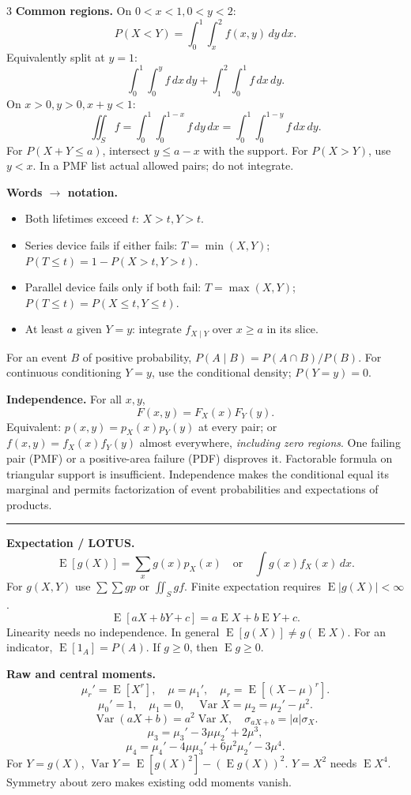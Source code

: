 \documentclass[letterpaper,landscape]{article}
\DeclareMathOperator{\E}{E}
\DeclareMathOperator{\Var}{Var}
\newcommand{\dd}{\,d}
\newcommand{\head}[1]{\vspace{3pt}{\color{navy}\bfseries\fontsize{10}{11}\selectfont #1}\par\vspace{1pt}\hrule\vspace{3pt}}
\newcommand{\mini}[1]{{\bfseries #1}}
\begin{document}
\begin{multicols*}{3}
\mini{Common regions.} On $0<x<1,0<y<2$:
\[
 P(X<Y)=\int_0^1\int_x^2 f(x,y)\dd y\dd x.
\]
Equivalently split at $y=1$:
\[
 \int_0^1\int_0^y f\dd x\dd y+
 \int_1^2\int_0^1 f\dd x\dd y.
\]
On $x>0,y>0,x+y<1$:
\[
 \iint_S f=\int_0^1\int_0^{1-x}f\dd y\dd x
 =\int_0^1\int_0^{1-y}f\dd x\dd y.
\]
For $P(X+Y\le a)$, intersect $y\le a-x$ with the support. For $P(X>Y)$, use $y<x$. In a PMF list actual allowed pairs; do not integrate.

\mini{Words $\to$ notation.}
\begin{itemize}[leftmargin=10pt,itemsep=1pt,topsep=1pt]
\item Both lifetimes exceed $t$: $X>t,Y>t$.
\item Series device fails if either fails:
$T=\min(X,Y)$; $P(T\le t)=1-P(X>t,Y>t)$.
\item Parallel device fails only if both fail:
$T=\max(X,Y)$; $P(T\le t)=P(X\le t,Y\le t)$.
\item At least $a$ given $Y=y$: integrate $f_{X\mid Y}$ over $x\ge a$ in its slice.
\end{itemize}
For an event $B$ of positive probability,
$P(A\mid B)=P(A\cap B)/P(B)$.
For continuous conditioning $Y=y$, use the conditional density; $P(Y=y)=0$.

\mini{Independence.} For all $x,y$,
\[
 F(x,y)=F_X(x)F_Y(y).
\]
Equivalent: $p(x,y)=p_X(x)p_Y(y)$ at every pair; or $f(x,y)=f_X(x)f_Y(y)$ almost everywhere, \emph{including zero regions}. One failing pair (PMF) or a positive-area failure (PDF) disproves it. Factorable formula on triangular support is insufficient. Independence makes the conditional equal its marginal and permits factorization of event probabilities and expectations of products.

\columnbreak
\head{3\quad Expectation, moments, MGFs}
\mini{Expectation / LOTUS.}
\[
\E[g(X)]=\sum_x g(x)p_X(x)
\quad\text{or}\quad\int g(x)f_X(x)\dd x.
\]
For $g(X,Y)$ use $\sum\sum g p$ or $\iint_S g f$.
Finite expectation requires $\E|g(X)|<\infty$.
\[
\E[aX+bY+c]=a\E X+b\E Y+c.
\]
Linearity needs no independence. In general $\E[g(X)]\ne g(\E X)$. For an indicator, $\E[1_A]=P(A)$. If $g\ge0$, then $\E g\ge0$.

\mini{Raw and central moments.}
\[
 \mu_r'=\E[X^r],\quad\mu=\mu_1',\quad
 \mu_r=\E[(X-\mu)^r].
\]
\[
 \mu_0'=1,\quad\mu_1=0,\quad
 \Var X=\mu_2=\mu_2'-\mu^2.
\]
\[
 \Var(aX+b)=a^2\Var X,\quad
 \sigma_{aX+b}=|a|\sigma_X.
\]
\[
\mu_3=\mu_3'-3\mu\mu_2'+2\mu^3,
\]
\[
\mu_4=\mu_4'-4\mu\mu_3'+6\mu^2\mu_2'-3\mu^4.
\]
For $Y=g(X)$, $\Var Y=\E[g(X)^2]-(\E g(X))^2$.
$Y=X^2$ needs $\E X^4$. Symmetry about zero makes existing odd moments vanish.


\end{multicols*}
\end{document}
